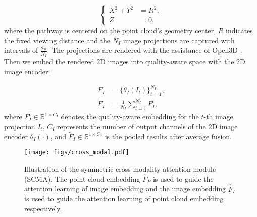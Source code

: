 \documentclass{article}
\begin{document}
\begin{equation}
\left\{
\begin{aligned}
X^2 + Y^2 &= R^2, \\
Z &= 0, 
\end{aligned}
\right.
\end{equation}
where the pathway is centered on the point cloud's geometry center, $R$ indicates the fixed viewing distance and the $N_{I}$ image projections are captured with intervals of $\frac{2\pi}{N_{I}}$. The projections are rendered with the assistance of Open3D \cite{zhou2018open3d}.
Then we embed the rendered 2D images into quality-aware space with the 2D image encoder:

\begin{equation}
\begin{aligned}
   F_{I} &= \{\theta_{I}(I_{t})\}_{t=1}^{N_{I}}, \\
   \widetilde{F}_{I} &= \frac{1}{N_{I}}\sum_{t = 1}^{N_{I}}F_{I}^{t},
\end{aligned} 
\end{equation}
where $F_{I}^{t} \in \mathbb{R}^{1 \times C_{I}}$ denotes the quality-aware embedding for the $t$-th image projection $I_{t}$, $C_{I}$ represents the number of output channels of the 2D image encoder $\theta_{I}(\cdot)$, and $\widetilde{F}_{I}  \in \mathbb{R}^{1 \times C_{I}}$ is the pooled results after average fusion.



\begin{figure}[t]
    \centering
    \texttt{[image: figs/cross\_modal.pdf]}
    \caption{Illustration of the symmetric cross-modality attention module (SCMA). The point cloud embedding $\hat{F}_{P}$ is used to guide the attention learning of image embedding and the image embedding $\hat{F}_{I}$ is used to guide the attention learning of point cloud embedding respectively.}
    \label{fig:cross_modal}
\end{figure}
\end{document}
